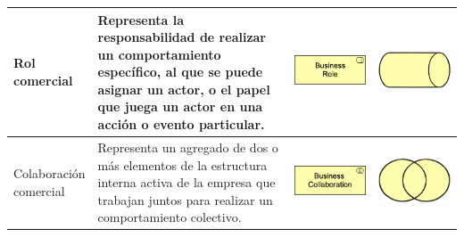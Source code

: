 \begin{longtable}{|p{0.15\linewidth}|p{0.45\linewidth}|p{0.2\linewidth} p{0.2\linewidth}|}
    Rol comercial 
    &
    Representa la responsabilidad de realizar un comportamiento específico, al que se puede asignar un actor, o el papel que juega un actor en una acción o evento particular.
    &
\begin{center}
    \includegraphics[width=1\linewidth]{imgs/capa_de_negocios/2.pdf}
\end{center} &
\begin{center}
    \includegraphics[width=0.5\linewidth]{imgs/capa_de_negocios/a2.pdf}
\end{center}
    \\ \hline



    Colaboración comercial
    &
    Representa un agregado de dos o más elementos de la estructura interna activa de la empresa que trabajan juntos para realizar un  comportamiento colectivo.
    &
\begin{center}
    \includegraphics[width=1\linewidth]{imgs/capa_de_negocios/3.pdf}
\end{center} &
\begin{center}
    \includegraphics[width=0.5\linewidth]{imgs/capa_de_negocios/a3.pdf}
\end{center}
    \\ \hline




\end{longtable}
